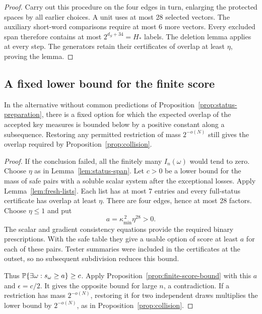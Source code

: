 \begin{proof}
Carry out this procedure on the four edges in turn, enlarging the
protected spaces by all earlier choices. A unit uses at most 28 selected
vectors. The auxiliary short-word comparisons require at most 6 more
vectors. Every excluded span therefore contains at most $2^{d_S+34}=H_*$
labels. The deletion lemma applies at every step. The generators retain their
certificates of overlap at least $\eta$, proving the lemma.
\end{proof}

\subsection{A fixed lower bound for the finite score}

\begin{proposition}\label{prop:positive-overlap}
In the alternative without common predictions of Proposition~\ref{prop:status-preparation},
there is a fixed option for which the expected overlap of the
accepted key measures is bounded below by a positive constant along
a subsequence. Restoring any permitted restriction of mass
\(2^{-o(N)}\) still gives the overlap required by
Proposition~\ref{prop:collision}.
\end{proposition}
\begin{proof}
If the conclusion failed, all the finitely many $I_n(\omega)$ would tend
to zero. Choose $\eta$ as in Lemma~\ref{lem:status-span}. Let $c>0$ be a
lower bound for the mass of safe pairs with a soluble scalar system after the exceptional
losses. Apply Lemma~\ref{lem:fresh-lists}. Each list has at most 7 entries
and every full-status certificate has overlap at least $\eta$.
There are four edges, hence at most 28 factors. Choose $\eta\le1$ and put
\begin{equation}\label{eq:finite-score-lower}
 a=\kappa_{\min}^{\,2}\eta^{28}>0.
\end{equation}
The scalar and gradient consistency equations provide the required
binary prescriptions. With the safe table they give a usable option
of score at least $a$ for each of these pairs. Tester summaries were
included in the certificates at the outset, so no subsequent subdivision
reduces this bound.

Thus \(\mathbb P\{\exists\omega:s_\omega\ge a\}\ge c\). Apply
Proposition~\ref{prop:finite-score-bound} with this \(a\) and
\(\epsilon=c/2\). It gives the opposite bound for large \(n\),
a contradiction. If a restriction has mass \(2^{-o(N)}\), restoring
it for two independent draws multiplies the lower bound by
\(2^{-o(N)}\), as in Proposition~\ref{prop:collision}.

\end{proof}

